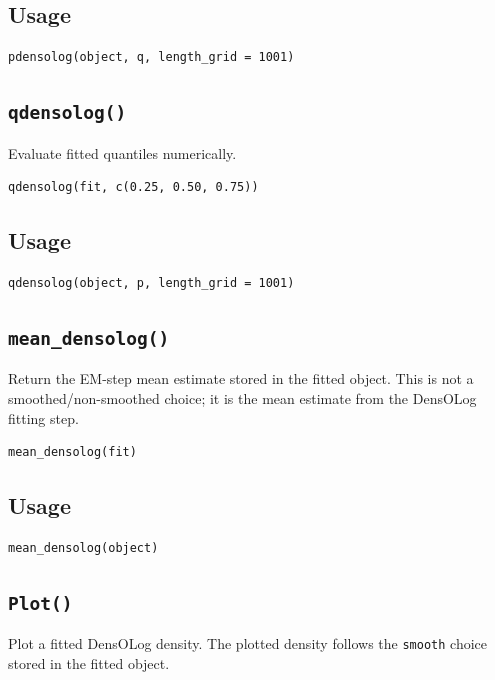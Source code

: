 \documentclass[11pt]{article}
\begin{document}
\subsection*{Usage}

\begin{lstlisting}
pdensolog(object, q, length_grid = 1001)
\end{lstlisting}

\subsection{\texttt{qdensolog()}}

Evaluate fitted quantiles numerically.

\begin{lstlisting}
qdensolog(fit, c(0.25, 0.50, 0.75))
\end{lstlisting}

\subsection*{Usage}

\begin{lstlisting}
qdensolog(object, p, length_grid = 1001)
\end{lstlisting}

\subsection{\texttt{mean\_densolog()}}

Return the EM-step mean estimate stored in the fitted object. This is not a
smoothed/non-smoothed choice; it is the mean estimate from the DensOLog fitting
step.

\begin{lstlisting}
mean_densolog(fit)
\end{lstlisting}

\subsection*{Usage}

\begin{lstlisting}
mean_densolog(object)
\end{lstlisting}

\subsection{\texttt{Plot()}}

Plot a fitted DensOLog density. The plotted density follows the \texttt{smooth}
choice stored in the fitted object.
\end{document}
